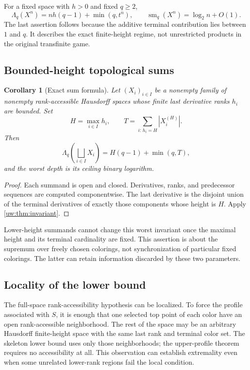 \documentclass[11pt,letterpaper]{article}
\numberwithin{equation}{section}
\newtheorem{corollary}[corollary]{Corollary}
\theoremstyle{definition}
\theoremstyle{remark}
\theoremstyle{definition}
\newcommand{\smq}{\operatorname{sm}_{q}}
\begin{document}
For a fixed space with $h>0$ and fixed $q\ge2$,
\begin{equation}\label{uw:eq:powers}
 \Lambda_q(X^n)=nh(q-1)+\min(q,t^n),\qquad
 \smq(X^n)=\log_2 n+O(1).
\end{equation}
The last assertion follows because the additive terminal contribution lies
between $1$ and $q$. It describes the exact finite-height regime, not
unrestricted products in the original transfinite game.

\subsection{Bounded-height topological sums}
\begin{corollary}[Exact sum formula]\label{uw:cor:sums}
Let $(X_i)_{i\in I}$ be a nonempty family of nonempty rank-accessible Hausdorff
spaces whose finite last derivative ranks $h_i$ are bounded. Set
\[
 H=\max_{i\in I}h_i,\qquad
 T=\sum_{i:\,h_i=H}|X_i^{(H)}|.
\]
Then
\begin{equation}\label{uw:eq:sum-invariant}
 \Lambda_q\!\left(\bigsqcup_{i\in I}X_i\right)=H(q-1)+\min(q,T),
\end{equation}
and the worst depth is its ceiling binary logarithm.
\end{corollary}
\begin{proof}
Each summand is open and closed. Derivatives, ranks, and predecessor sequences
are computed componentwise. The last derivative is the disjoint union of the
terminal derivatives of exactly those components whose height is $H$.
Apply \cref{uw:thm:invariant}.
\end{proof}

Lower-height summands cannot change this worst invariant once the maximal
height and its terminal cardinality are fixed. This assertion is about the
supremum over freely chosen colorings, not synchronization of particular
fixed colorings. The latter can retain information discarded by these two
parameters.

\subsection{Locality of the lower bound}
The full-space rank-accessibility hypothesis can be localized. To force the
profile associated with $S$, it is enough that one selected top point of each
color have an open rank-accessible neighborhood. The rest of the space may
be an arbitrary Hausdorff finite-height space with the same last rank and
terminal color set. The skeleton lower bound uses only those neighborhoods;
the upper-profile theorem requires no accessibility at all. This observation
can establish extremality even when some unrelated lower-rank regions fail
the local condition.
\end{document}
